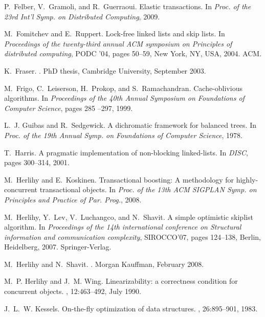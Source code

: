 \begin{thebibliography}{99}
{
P.~Felber, V.~Gramoli, and R.~Guerraoui.
\newblock Elastic transactions.
\newblock In {\em Proc. of the 23rd Int'l Symp. on Distributed Computing},
  2009.

M.~Fomitchev and E.~Ruppert.
\newblock Lock-free linked lists and skip lists.
\newblock In {\em Proceedings of the twenty-third annual ACM symposium on
  Principles of distributed computing}, PODC '04, pages 50--59, New York, NY,
  USA, 2004. ACM.

K.~Fraser.
.
\newblock PhD thesis, Cambridge University, September 2003.

M.~Frigo, C.~Leiserson, H.~Prokop, and S.~Ramachandran.
\newblock Cache-oblivious algorithms.
\newblock In {\em Proceedings of the 40th Annual Symposium on Foundations of
  Computer Science}, pages 285 --297, 1999.

L.~J. Guibas and R.~Sedgewick.
\newblock A dichromatic framework for balanced trees.
\newblock In {\em Proc. of the 19th Annual Symp. on Foundations of Computer
  Science}, 1978.

T.~Harris.
\newblock A pragmatic implementation of non-blocking linked-lists.
\newblock In {\em DISC}, pages 300--314, 2001.

M.~Herlihy and E.~Koskinen.
\newblock Transactional boosting: A methodology for highly-concurrent
  transactional objects.
\newblock In {\em Proc. of the 13th ACM SIGPLAN Symp. on Principles and
  Practice of Par. Prog.}, 2008.

M.~Herlihy, Y.~Lev, V.~Luchangco, and N.~Shavit.
\newblock A simple optimistic skiplist algorithm.
\newblock In {\em Proceedings of the 14th international conference on
  Structural information and communication complexity}, SIROCCO'07, pages
  124--138, Berlin, Heidelberg, 2007. Springer-Verlag.

M.~Herlihy and N.~Shavit.
.
\newblock Morgan Kauffman, February 2008.

M.~P. Herlihy and J.~M. Wing.
\newblock Linearizability: a correctness condition for concurrent objects.
, 12:463--492, July 1990.

J.~L.~W. Kessels.
\newblock On-the-fly optimization of data structures.
, 26:895--901, 1983.

}
\end{thebibliography}
